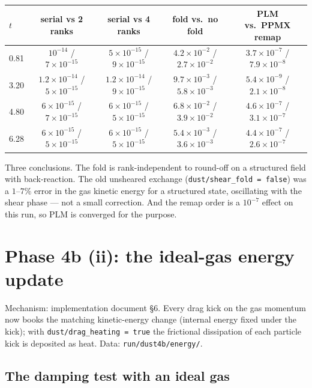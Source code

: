 \documentclass[11pt]{article}
\newcommand{\code}[1]{\texttt{#1}}
\newcommand{\file}[1]{\texttt{#1}}
\begin{document}
\begin{center}
\small
\begin{tabular}{@{}lcccc@{}}
\toprule
$t$ & serial vs 2 ranks & serial vs 4 ranks & fold vs.\ no fold & PLM vs.\ PPMX remap \\
\midrule
0.81 & $10^{-14}$ / $7\times10^{-15}$ & $5\times10^{-15}$ / $9\times10^{-15}$ & $4.2\times10^{-2}$ / $2.7\times10^{-2}$ & $3.7\times10^{-7}$ / $7.9\times10^{-8}$ \\
3.20 & $1.2\times10^{-14}$ / $5\times10^{-15}$ & $1.2\times10^{-14}$ / $9\times10^{-15}$ & $9.7\times10^{-3}$ / $5.8\times10^{-3}$ & $5.4\times10^{-9}$ / $2.1\times10^{-8}$ \\
4.80 & $6\times10^{-15}$ / $7\times10^{-15}$ & $6\times10^{-15}$ / $5\times10^{-15}$ & $6.8\times10^{-2}$ / $3.9\times10^{-2}$ & $4.6\times10^{-7}$ / $3.1\times10^{-7}$ \\
6.28 & $6\times10^{-15}$ / $5\times10^{-15}$ & $6\times10^{-15}$ / $5\times10^{-15}$ & $5.4\times10^{-3}$ / $3.6\times10^{-3}$ & $4.4\times10^{-7}$ / $2.6\times10^{-7}$ \\
\bottomrule
\end{tabular}
\end{center}

Three conclusions. The fold is rank-independent to round-off on a structured field
with back-reaction. The old unsheared exchange (\code{dust/shear\_fold = false}) was a
$1$--$7\%$ error in the gas kinetic energy for a structured state, oscillating with the
shear phase --- not a small correction. And the remap order is a $10^{-7}$ effect on
this run, so PLM is converged for the purpose.

\section{Phase 4b (ii): the ideal-gas energy update}
\label{sec:phase4b2}

Mechanism: implementation document \S6. Every drag kick on the gas momentum now books
the matching kinetic-energy change (internal energy fixed under the kick); with
\code{dust/drag\_heating = true} the frictional dissipation of each particle kick is
deposited as heat. Data: \file{run/dust4b/energy/}.

\subsection{The damping test with an ideal gas}
\end{document}
